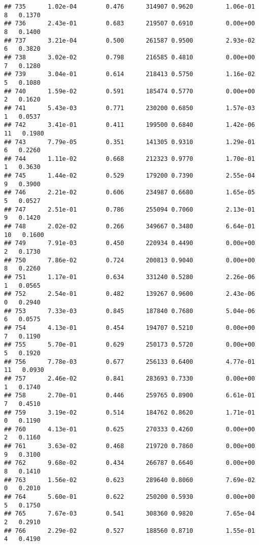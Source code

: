 \documentclass[
]{article}
\begin{document}
\begin{verbatim}
## 735      1.02e-04        0.476      314907 0.9620         1.06e-01   8   0.1370
## 736      2.43e-01        0.683      219507 0.6910         0.00e+00   8   0.1400
## 737      3.21e-04        0.500      261587 0.9500         2.93e-02   6   0.3820
## 738      3.02e-02        0.798      216585 0.4810         0.00e+00   7   0.1280
## 739      3.04e-01        0.614      218413 0.5750         1.16e-02   5   0.1080
## 740      1.59e-02        0.591      185474 0.5770         0.00e+00   2   0.1620
## 741      5.43e-03        0.771      230200 0.6850         1.57e-03   1   0.0537
## 742      3.41e-01        0.411      199500 0.6840         1.42e-06  11   0.1980
## 743      7.79e-05        0.351      141305 0.9310         1.29e-01   6   0.2260
## 744      1.11e-02        0.668      212323 0.9770         1.70e-01   1   0.3630
## 745      1.44e-02        0.529      179200 0.7390         2.55e-04   9   0.3900
## 746      2.21e-02        0.606      234987 0.6680         1.65e-05   5   0.0527
## 747      2.51e-01        0.786      255094 0.7060         2.13e-01   9   0.1420
## 748      2.02e-02        0.266      349667 0.3480         6.64e-01  10   0.1600
## 749      7.91e-03        0.450      220934 0.4490         0.00e+00   2   0.1730
## 750      7.86e-02        0.724      200813 0.9040         0.00e+00   8   0.2260
## 751      1.17e-01        0.634      331240 0.5280         2.26e-06   1   0.0565
## 752      2.54e-01        0.482      139267 0.9600         2.43e-06   0   0.2940
## 753      7.33e-03        0.845      187840 0.7680         5.04e-06   6   0.0575
## 754      4.13e-01        0.454      194707 0.5210         0.00e+00   7   0.1190
## 755      5.70e-01        0.629      250173 0.5720         0.00e+00   5   0.1920
## 756      7.78e-03        0.677      256133 0.6400         4.77e-01  11   0.0930
## 757      2.46e-02        0.841      283693 0.7330         0.00e+00   1   0.1740
## 758      2.70e-01        0.446      259765 0.8900         6.61e-01   7   0.4510
## 759      3.19e-02        0.514      184762 0.8620         1.71e-01   0   0.1190
## 760      4.13e-01        0.625      270333 0.4260         0.00e+00   2   0.1160
## 761      3.63e-02        0.468      219720 0.7860         0.00e+00   9   0.3100
## 762      9.68e-02        0.434      266787 0.6640         0.00e+00   8   0.1410
## 763      1.56e-02        0.623      289640 0.8060         7.69e-02   0   0.2010
## 764      5.60e-01        0.622      250200 0.5930         0.00e+00   5   0.1750
## 765      7.67e-03        0.541      308360 0.9820         7.65e-04   2   0.2910
## 766      2.29e-02        0.527      188560 0.8710         1.55e-01   4   0.4190

\end{verbatim}
\end{document}

